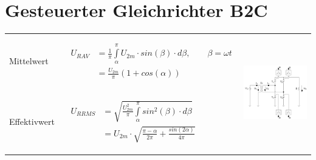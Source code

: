 \section{Gesteuerter Gleichrichter B2C}

\begin{tabu}{|l|l|p{0.3\textwidth}}
  Mittelwert 
  	&\ $\begin{aligned}
  			U_{R AV} &= \frac{1}{\pi}\int\limits_{\alpha}^{\pi}U_{2m} \cdot sin(\beta) \cdot d\beta, \qquad \beta = \omega t\\
  						&= \frac{U_{2m}}{\pi}(1 + cos(\alpha))
  		\end{aligned}$ 
  		& \\
  Effektivwert 
  	&\ $\begin{aligned}
  		U_{R RMS} &= \sqrt{\frac{U_{2m}^2}{\pi}\int\limits_{\alpha}^{\pi}sin^2(\beta) \cdot d\beta}\\
  					&= U_{2m} \cdot \sqrt{\frac{\pi-\alpha}{2\pi}+\frac{sin(2\alpha)}{4\pi}}
  		\end{aligned}$ &\\
\end{tabu}